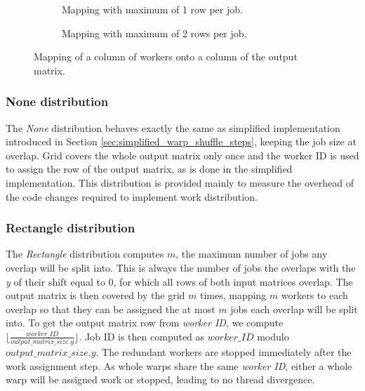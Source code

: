 \begin{figure}[ht]
	\centering	
	\begin{subfigure}{0.7\textwidth}
	\centering
		\def\svgwidth{\textwidth}
		\fontsize{6}{8}\selectfont
		
		\caption{Mapping with maximum of 1 row per job.}
		\label{fig:work_dist_max_1}
	\end{subfigure}
	\hfill
	\begin{subfigure}{0.6\textwidth}
 		\centering
		\def\svgwidth{\textwidth}
		\fontsize{6}{8}\selectfont
		
		\caption{Mapping with maximum of 2 rows per job.}
		\label{fig:work_dist_max_2}
	\end{subfigure}
	
	\caption{Mapping of a column of workers onto a column of the output matrix.}
	\label{fig:work_distribution_examples}
\end{figure}


\subsubsection{None distribution}		
The \textit{None} distribution behaves exactly the same as simplified implementation introduced in Section \ref{sec:simplified_warp_shuffle_steps}, keeping the job size at overlap. Grid covers the whole output matrix only once and the worker ID is used to assign the row of the output matrix, as is done in the simplified implementation. This distribution is provided mainly to measure the overhead of the code changes required to implement work distribution. 

\subsubsection{Rectangle distribution}

The \textit{Rectangle} distribution computes $m$, the maximum number of jobs any overlap will be split into. This is always the number of jobs the overlaps with the \textit{y} of their shift equal to $0$, for which all rows of both input matrices overlap. The output matrix is then covered by the grid $m$ times, mapping $m$ workers to each overlap so that they can be assigned the at most $m$ jobs each overlap will be split
into. To get the output matrix row from \textit{worker ID}, we compute $\lfloor\frac{worker\_ID}{output\_matrix\_size.y}\rfloor$. Job ID is then computed as $worker\_ID$ modulo $output\_matrix\_size.y$. The redundant workers are stopped immediately after the work assignment step. As whole warps share the same \textit{worker ID}, either a whole warp will be assigned work or stopped, leading to no thread divergence. 

